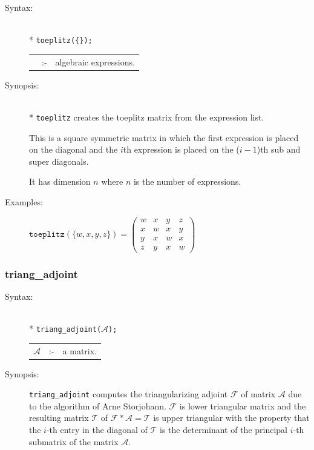 {\begin{description}
\item[Syntax:]\mbox{}\\*
{\tt toeplitz(\{\exprlist{}\});} \lazyfootnote{}\\[2mm]
\begin{tabular}{l l l}
\exprlist{} &:-& algebraic expressions.
\end{tabular}

\item[Synopsis:]\mbox{}\\*
\texttt{toeplitz} creates the toeplitz matrix from the
                expression list.

This is a square symmetric matrix in
                which the first expression is placed on the diagonal
                and the $i$th expression is placed on the ($i-1$)th sub
                and super diagonals.

It has dimension $n$ where $n$ is the
                number of expressions.

\item[Examples:]
\begin{flushleft}
\(
\texttt{toeplitz}(\{w,x,y,z\}) =
        \begin{pmatrix} w & x & y & z \\ x & w & x & y \\
      y & x & w & x \\ z & y & x & w
\end{pmatrix}
\)
\end{flushleft}
\end{description}

\subsubsection{triang\_adjoint}
\label{linalg:triang_adjoint}
\hypertarget{operator:TRIANG_ADJOINT}{}

\begin{description}
\item[Syntax:]\mbox{}\\*
{\tt triang\_adjoint($\mathcal{A}$);}\\[2mm]
\begin{tabular}{l l l}
$\mathcal{A}$  &:-& a matrix.
\end{tabular}

\item[Synopsis:]

\texttt{triang\_adjoint} computes the triangularizing adjoint $\mathcal{F}$ of
matrix $\mathcal{A}$ due to the algorithm of Arne Storjohann. $\mathcal{F}$ is
lower triangular matrix and the resulting matrix $\mathcal{T}$ of
$\mathcal{F * A = T}$ is upper triangular with the property that the $i$-th
entry in the diagonal of $\mathcal{T}$ is the determinant of the principal
$i$-th submatrix of the matrix $\mathcal{A}$.


\end{description}}
